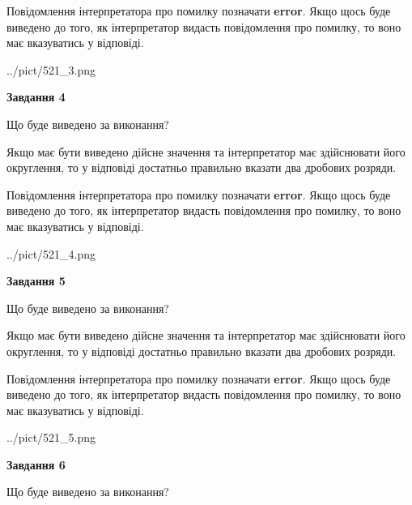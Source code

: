 \documentclass[12pt, ukrainian]{article}
\begin{document}
{\begin {Large}
Повідомлення інтерпретатора про помилку позначати \textbf{error}.
Якщо щось буде виведено до того, як інтерпретатор видасть повідомлення про помилку, 
то воно має вказуватись у відповіді. \par

\begin{center}
	{../pict/521_3.png}
\end{center}
\newpage

{\begin {center}\textbf{Завдання 4}\end {center}}\par
Що буде виведено за виконання? \par

Якщо має бути виведено дійсне значення та інтерпретатор має здійснювати його округлення, 
то у відповіді достатньо правильно вказати два дробових розряди.

Повідомлення інтерпретатора про помилку позначати \textbf{error}.
Якщо щось буде виведено до того, як інтерпретатор видасть повідомлення про помилку, 
то воно має вказуватись у відповіді. \par

\begin{center}
	{../pict/521_4.png}
\end{center}
\newpage

{\begin {center}\textbf{Завдання 5}\end {center}}\par
Що буде виведено за виконання? \par

Якщо має бути виведено дійсне значення та інтерпретатор має здійснювати його округлення, 
то у відповіді достатньо правильно вказати два дробових розряди.

Повідомлення інтерпретатора про помилку позначати \textbf{error}.
Якщо щось буде виведено до того, як інтерпретатор видасть повідомлення про помилку, 
то воно має вказуватись у відповіді. \par

\begin{center}
	{../pict/521_5.png}
\end{center}
\newpage

{\begin {center}\textbf{Завдання 6}\end {center}}\par
Що буде виведено за виконання? \par


\end{Large}}
\end{document}
